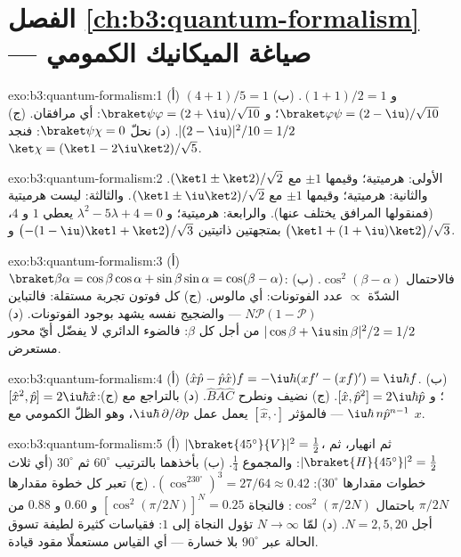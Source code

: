 \section*{الفصل \ref{ch:b3:quantum-formalism} --- صياغة الميكانيك الكمومي}

\begin{solution}{exo:b3:quantum-formalism:1}
(أ) $(4 + 1)/5 = 1$ و $(1 + 1)/2 = 1$. (ب) $\braket\varphi\psi =
(2 - \iu)/\sqrt{10}$؛ و $\braket\psi\varphi = (2 + \iu)/\sqrt{10}$:
أي مرافقان. (ج) $|(2 - \iu)|^2/10 = 1/2$. (د) نحلّ
$\braket\psi\chi = 0$: فنجد $\ket\chi = (\ket1 - 2\iu\ket2)/\sqrt5$.
\end{solution}

\begin{solution}{exo:b3:quantum-formalism:2}
الأولى: هرميتية؛ وقيمها $\pm1$ مع $(\ket1 \pm \ket2)/\sqrt2$. والثانية:
هرميتية؛ وقيمها $\pm1$ مع $(\ket1 \pm \iu\ket2)/\sqrt2$. والثالثة: ليست
هرميتية (فمنقولها المرافق يختلف عنها). والرابعة: هرميتية؛
و $\lambda^2 - 5\lambda + 4 = 0$ يعطي $1$ و $4$، بمتجهتين ذاتيتين
$\big({-(1 - \iu)}\ket1 + \ket2\big)/\sqrt3$ و $\big(\ket1 +
(1 + \iu)\ket2\big)/\sqrt3$.
\end{solution}

\begin{solution}{exo:b3:quantum-formalism:3}
(أ) $\braket\beta\alpha = \cos\beta\cos\alpha + \sin\beta\sin\alpha
= \cos(\beta - \alpha)$: فالاحتمال $\cos^2(\beta - \alpha)$. (ب)
الشدّة $\propto$ عدد الفوتونات: أي مالوس. (ج) كل فوتون تجربة
مستقلة: فالتباين $N\mathcal P(1 - \mathcal P)$ --- والضجيج
نفسه يشهد بوجود الفوتونات. (د) $|\cos\beta + \iu\sin\beta|^2/2
= 1/2$ من أجل كل $\beta$: فالضوء الدائري لا يفضّل أيّ محور
مستعرض.
\end{solution}

\begin{solution}{exo:b3:quantum-formalism:4}
(أ) $(\hat x\hat p - \hat p\hat x)f = -\iu\hbar(xf' - (xf)') =
\iu\hbar f$. (ب) $[\hat x^2, \hat p] = 2\iu\hbar\hat x$؛ و $[\hat x,
\hat p^2] = 2\iu\hbar\hat p$. (ج) نضيف ونطرح $\hat B\hat A
\hat C$. (د) بالتراجع مع (ج): $\iu\hbar\,n\hat p^{n-1}$ ---
فالمؤثر $[\hat x, \cdot]$ يعمل عمل $\iu\hbar\,\partial/\partial p$، وهو
الظلّ الكمومي  مع $x$.
\end{solution}

\begin{solution}{exo:b3:quantum-formalism:5}
(أ) $|\braket{45^\circ}{V}|^2 = \tfrac12$، ثم انهيار، ثم
$|\braket{H}{45^\circ}|^2 = \tfrac12$: والمجموع $\tfrac14$. (ب) بأخذهما
بالترتيب $60^\circ$ ثم $30^\circ$ (أي ثلاث خطوات مقدارها $30^\circ$):
$(\cos^230^\circ)^3 = 27/64 \approx 0.42$. (ج) تعبر كل خطوة مقدارها
$\pi/2N$ باحتمال $\cos^2(\pi/2N)$: فالنجاة $[\cos^2(\pi/2N)]^N
= 0.25$ و $0.60$ و $0.88$ من أجل $N = 2, 5, 20$. (د) لمّا $N \to \infty$
تؤول النجاة إلى $1$: فقياسات كثيرة لطيفة تسوق الحالة
عبر $90^\circ$ بلا خسارة --- أي القياس مستعملًا مقود قيادة.
\end{solution}

